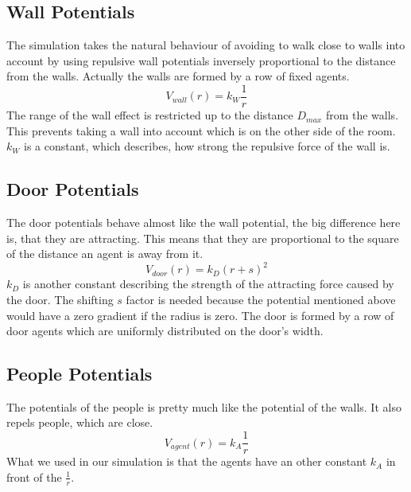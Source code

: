 \subsection{Wall Potentials} 

The simulation takes the natural behaviour of
avoiding to walk close to walls into account by using repulsive wall
potentials inversely proportional to the distance from the walls. 
Actually the walls are formed by a row of fixed agents. 
\[V_{wall}(r) = k_W  \frac{1}{r}\]
The range of the wall effect is restricted up to the distance $D_{max}$ from
the walls. This prevents taking a wall into account which is on the other side
of the room. $k_W$ is a constant, which describes, how strong the repulsive 
force of the wall is.

\subsection{Door Potentials}
The door potentials behave almost like the wall potential, the big difference
here is, that they are attracting. This means that they are proportional to
the square of the distance an agent is away from it.
\[V_{door}(r) = k_D (r + s)^2\]
$k_D$ is another constant describing the strength of the attracting force
caused by the door. The shifting $s$ factor is needed because the potential
mentioned above would have a zero gradient if the radius is zero. The door is
formed by a row of door agents which are uniformly distributed on the door's
width.

\subsection{People Potentials}
The potentials of the people is pretty much like the potential of the walls.
It also repels people, which are close.
\[V_{agent}(r) = k_A  \frac{1}{r}\]
What we used in our simulation is that the agents have an other constant $k_A$
in front of the $\frac{1}{r}$.

